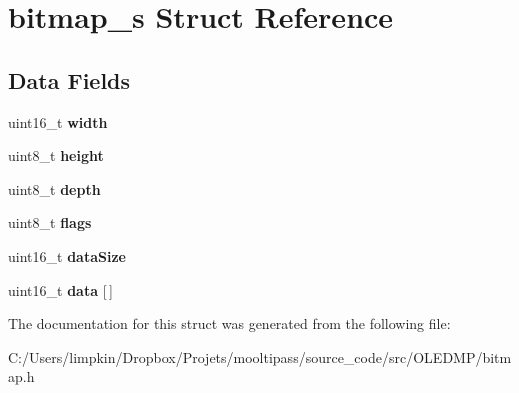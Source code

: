 \hypertarget{structbitmap__s}{\section{bitmap\-\_\-s Struct Reference}
\label{structbitmap__s}
}
\subsection*{Data Fields}
\begin{DoxyCompactItemize}
\item 
\hypertarget{structbitmap__s_ad0eab1042455a2067c812ab8071d5376}{uint16\-\_\-t {\bfseries width}}\label{structbitmap__s_ad0eab1042455a2067c812ab8071d5376}

\item 
\hypertarget{structbitmap__s_adcf201a8aabf55cb352ec05331242594}{uint8\-\_\-t {\bfseries height}}\label{structbitmap__s_adcf201a8aabf55cb352ec05331242594}

\item 
\hypertarget{structbitmap__s_ab6f276082172be43a6041212071e377b}{uint8\-\_\-t {\bfseries depth}}\label{structbitmap__s_ab6f276082172be43a6041212071e377b}

\item 
\hypertarget{structbitmap__s_aa2585d779da0ab21273a8d92de9a0ebe}{uint8\-\_\-t {\bfseries flags}}\label{structbitmap__s_aa2585d779da0ab21273a8d92de9a0ebe}

\item 
\hypertarget{structbitmap__s_afe5dbe9ff0f4a3d528fdd0697ad730eb}{uint16\-\_\-t {\bfseries data\-Size}}\label{structbitmap__s_afe5dbe9ff0f4a3d528fdd0697ad730eb}

\item 
\hypertarget{structbitmap__s_a150379680c51ad51c2ffc0c53c051d9f}{uint16\-\_\-t {\bfseries data} \mbox{[}$\,$\mbox{]}}\label{structbitmap__s_a150379680c51ad51c2ffc0c53c051d9f}

\end{DoxyCompactItemize}


The documentation for this struct was generated from the following file\-:\begin{DoxyCompactItemize}
\item 
C\-:/\-Users/limpkin/\-Dropbox/\-Projets/mooltipass/source\-\_\-code/src/\-O\-L\-E\-D\-M\-P/bitmap.\-h\end{DoxyCompactItemize}
